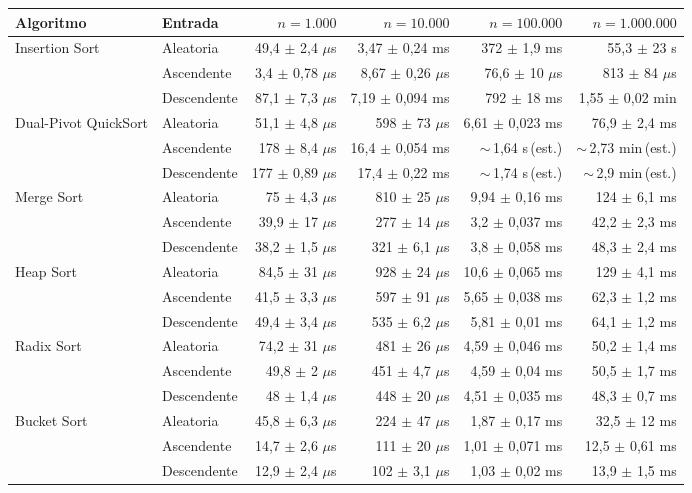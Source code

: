 {\scriptsize
\begin{tabular}{llrrrr}
\toprule
Algoritmo & Entrada & $n=1.000$ & $n=10.000$ & $n=100.000$ & $n=1.000.000$ \\
\midrule
Insertion Sort & Aleatoria & 49,4 $\pm$ 2,4 $\mu$s & 3,47 $\pm$ 0,24 ms & 372 $\pm$ 1,9 ms & 55,3 $\pm$ 23 s \\
 & Ascendente & 3,4 $\pm$ 0,78 $\mu$s & 8,67 $\pm$ 0,26 $\mu$s & 76,6 $\pm$ 10 $\mu$s & 813 $\pm$ 84 $\mu$s \\
 & Descendente & 87,1 $\pm$ 7,3 $\mu$s & 7,19 $\pm$ 0,094 ms & 792 $\pm$ 18 ms & 1,55 $\pm$ 0,02 min \\
Dual-Pivot QuickSort & Aleatoria & 51,1 $\pm$ 4,8 $\mu$s & 598 $\pm$ 73 $\mu$s & 6,61 $\pm$ 0,023 ms & 76,9 $\pm$ 2,4 ms \\
 & Ascendente & 178 $\pm$ 8,4 $\mu$s & 16,4 $\pm$ 0,054 ms & $\sim$\,1,64 s\,(est.) & $\sim$\,2,73 min\,(est.) \\
 & Descendente & 177 $\pm$ 0,89 $\mu$s & 17,4 $\pm$ 0,22 ms & $\sim$\,1,74 s\,(est.) & $\sim$\,2,9 min\,(est.) \\
Merge Sort & Aleatoria & 75 $\pm$ 4,3 $\mu$s & 810 $\pm$ 25 $\mu$s & 9,94 $\pm$ 0,16 ms & 124 $\pm$ 6,1 ms \\
 & Ascendente & 39,9 $\pm$ 17 $\mu$s & 277 $\pm$ 14 $\mu$s & 3,2 $\pm$ 0,037 ms & 42,2 $\pm$ 2,3 ms \\
 & Descendente & 38,2 $\pm$ 1,5 $\mu$s & 321 $\pm$ 6,1 $\mu$s & 3,8 $\pm$ 0,058 ms & 48,3 $\pm$ 2,4 ms \\
Heap Sort & Aleatoria & 84,5 $\pm$ 31 $\mu$s & 928 $\pm$ 24 $\mu$s & 10,6 $\pm$ 0,065 ms & 129 $\pm$ 4,1 ms \\
 & Ascendente & 41,5 $\pm$ 3,3 $\mu$s & 597 $\pm$ 91 $\mu$s & 5,65 $\pm$ 0,038 ms & 62,3 $\pm$ 1,2 ms \\
 & Descendente & 49,4 $\pm$ 3,4 $\mu$s & 535 $\pm$ 6,2 $\mu$s & 5,81 $\pm$ 0,01 ms & 64,1 $\pm$ 1,2 ms \\
Radix Sort & Aleatoria & 74,2 $\pm$ 31 $\mu$s & 481 $\pm$ 26 $\mu$s & 4,59 $\pm$ 0,046 ms & 50,2 $\pm$ 1,4 ms \\
 & Ascendente & 49,8 $\pm$ 2 $\mu$s & 451 $\pm$ 4,7 $\mu$s & 4,59 $\pm$ 0,04 ms & 50,5 $\pm$ 1,7 ms \\
 & Descendente & 48 $\pm$ 1,4 $\mu$s & 448 $\pm$ 20 $\mu$s & 4,51 $\pm$ 0,035 ms & 48,3 $\pm$ 0,7 ms \\
Bucket Sort & Aleatoria & 45,8 $\pm$ 6,3 $\mu$s & 224 $\pm$ 47 $\mu$s & 1,87 $\pm$ 0,17 ms & 32,5 $\pm$ 12 ms \\
 & Ascendente & 14,7 $\pm$ 2,6 $\mu$s & 111 $\pm$ 20 $\mu$s & 1,01 $\pm$ 0,071 ms & 12,5 $\pm$ 0,61 ms \\
 & Descendente & 12,9 $\pm$ 2,4 $\mu$s & 102 $\pm$ 3,1 $\mu$s & 1,03 $\pm$ 0,02 ms & 13,9 $\pm$ 1,5 ms \\
\bottomrule
\end{tabular}}\par
